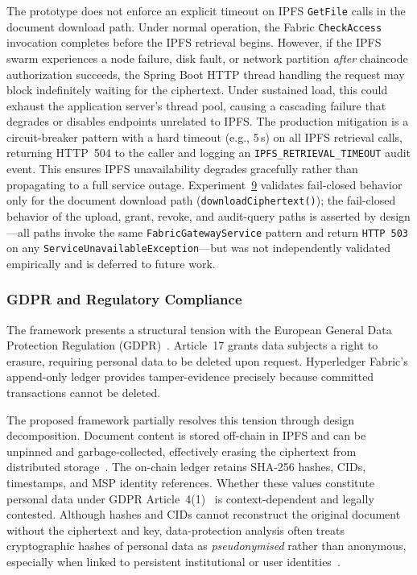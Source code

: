 \documentclass{ieeeaccess}
\begin{document}
The prototype does not enforce an explicit timeout on IPFS \texttt{GetFile} calls in the document download path. Under normal operation, the Fabric \texttt{CheckAccess} invocation completes before the IPFS retrieval begins. However, if the IPFS swarm experiences a node failure, disk fault, or network partition \emph{after} chaincode authorization succeeds, the Spring Boot HTTP thread handling the request may block indefinitely waiting for the ciphertext. Under sustained load, this could exhaust the application server's thread pool, causing a cascading failure that degrades or disables endpoints unrelated to IPFS. The production mitigation is a circuit-breaker pattern with a hard timeout (e.g., 5\,s) on all IPFS retrieval calls, returning HTTP~504 to the caller and logging an \texttt{IPFS\_RETRIEVAL\_TIMEOUT} audit event. This ensures IPFS unavailability degrades gracefully rather than propagating to a full service outage. Experiment~\hyperref[sec:exp_failclosed]{9} validates fail-closed behavior only for the document download path (\texttt{downloadCiphertext()}); the fail-closed behavior of the upload, grant, revoke, and audit-query paths is asserted by design---all paths invoke the same \texttt{FabricGatewayService} pattern and return \texttt{HTTP~503} on any \texttt{ServiceUnavailableException}---but was not independently validated empirically and is deferred to future work.

\subsubsection{GDPR and Regulatory Compliance}
\label{sec:gdpr}
The framework presents a structural tension with the European General
Data Protection Regulation (GDPR)~\cite{gdpr2016}. Article~17
grants data subjects a right to erasure, requiring personal data to
be deleted upon request. Hyperledger Fabric's append-only ledger
provides tamper-evidence precisely because committed transactions
cannot be deleted.

The proposed framework partially resolves this tension through design decomposition. Document content is stored off-chain in IPFS and can be unpinned and garbage-collected, effectively erasing the ciphertext from distributed storage~\cite{ipfsDocsQuickstartPin2025,ipfsDocsKuboGarbageCollection}. The on-chain ledger retains SHA-256 hashes, CIDs, timestamps, and MSP
identity references. Whether these values constitute personal data under GDPR Article~4(1)~\cite{gdpr2016} is context-dependent and legally contested.
Although hashes and CIDs cannot reconstruct the original document without the ciphertext and key, data-protection analysis often treats
cryptographic hashes of personal data as \emph{pseudonymised} rather
than anonymous, especially when linked to persistent institutional or user identities~\cite{finck2019blockchain,politou2019metadata}.
\end{document}

